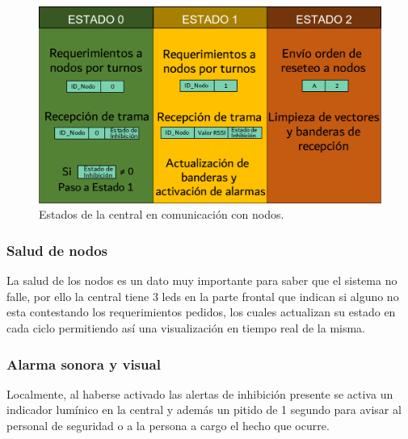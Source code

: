 \begin{figure}[h!]
	\centering
	\includegraphics[scale=.53]{images/central/maquina-estado-central.png}
    \caption{Estados de la central en comunicación con nodos.}
	\label{im:maq-est-central}
\end{figure}


\subsubsection{Salud de nodos}
\par La salud de los nodos es un dato muy importante para saber que el sistema no falle, por ello 
la central tiene 3 leds en la parte frontal que indican si alguno no esta contestando los 
requerimientos pedidos, los cuales actualizan su estado en cada ciclo permitiendo así una 
visualización en tiempo real de la misma. 

\subsubsection{Alarma sonora y visual}
\par Localmente, al haberse activado las alertas de inhibición presente se activa un indicador 
lumínico en la central y además un pitido de 1 segundo para avisar al personal de seguridad o a 
la persona a cargo el hecho que ocurre. 

